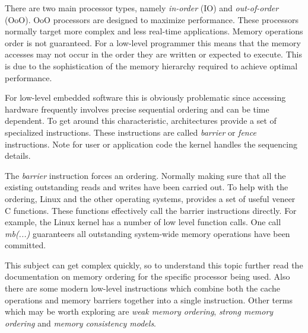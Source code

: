 There are two main processor types, namely \textit{in-order} (IO) and \textit{out-of-order} (OoO). OoO processors are designed to maximize performance. These processors normally target more complex and less real-time applications. Memory operations order is not guaranteed. For a low-level programmer this means that the memory accesses may not occur in the order they are written or expected to execute. This is due to the sophistication of the memory hierarchy required to achieve optimal performance.

For low-level embedded software this is obviously problematic since accessing hardware frequently involves precise sequential ordering and can be time dependent. To get around this characteristic, architectures provide a set of specialized instructions. These instructions are called \textit{barrier} or \textit{fence} instructions. Note for user or application code the kernel handles the sequencing details. 

The \textit{barrier} instruction forces an ordering. Normally making sure that all the existing outstanding reads and writes have been carried out. To help with the ordering, Linux and the other operating systems, provides a set of useful veneer C functions. These functions effectively call the barrier instructions directly. For example, the Linux kernel has a number of low level function calls. One call \textit{mb(...)} guaranteers all outstanding system-wide memory operations have been committed. 

This subject can get complex quickly, so to understand this topic further read the documentation on memory ordering for the specific processor being used. Also there are some modern low-level instructions which combine both the cache operations and memory barriers together into a single instruction. Other terms which may be worth exploring are \textit{weak memory ordering}, \textit{strong memory ordering} and \textit{memory consistency models}.
